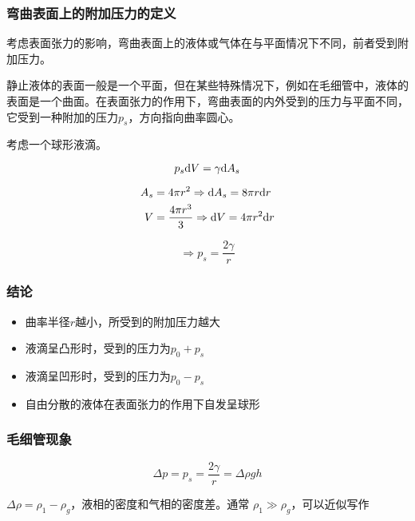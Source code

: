 \subsubsection{弯曲表面上的附加压力的定义}

考虑表面张力的影响，弯曲表面上的液体或气体在与平面情况下不同，前者受到附加压力。

静止液体的表面一般是一个平面，但在某些特殊情况下，例如在毛细管中，液体的表面是一个曲面。在表面张力的作用下，弯曲表面的内外受到的压力与平面不同，它受到一种附加的压力$p_s$，方向指向曲率圆心。

考虑一个球形液滴。

\begin{equation*}
    p_s \mathrm{d} V = \gamma \mathrm{d} A_s
\end{equation*}

\begin{align*}
    A_s & = 4 \pi r^2           \Rightarrow \mathrm{d} A_s = 8 \pi r \mathrm{d} r \\
    V   & = \frac{4 \pi r^3}{3} \Rightarrow \mathrm{d} V = 4 \pi r^2 \mathrm{d} r \\
\end{align*}

\begin{equation*}
    \Rightarrow p_s = \frac{2\gamma}{r}
\end{equation*}

\subsubsection{结论}

\begin{itemize}
    \item 曲率半径$r$越小，所受到的附加压力越大
    \item 液滴呈凸形时，受到的压力为$p_0 + p_s$
    \item 液滴呈凹形时，受到的压力为$p_0 - p_s$
    \item 自由分散的液体在表面张力的作用下自发呈球形
\end{itemize}


\subsubsection{毛细管现象}

\begin{equation*}
    \Delta p = p_s = \frac{2\gamma}{r} = \Delta \rho g h
\end{equation*}

$\Delta \rho  = \rho_1 - \rho_g$，液相的密度和气相的密度差。通常 $\rho_1 \gg \rho_g$，可以近似写作

